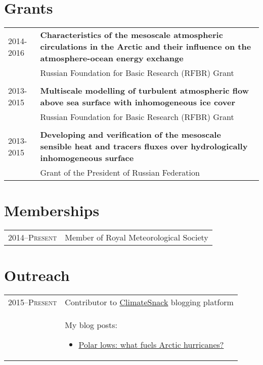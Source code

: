 \documentclass[a4paper,11pt]{article}
\newlength{\mycol}
\begin{document}
\section{Grants}
\begin{tabu} to 	
 2014-2016 & \textbf{Characteristics of the mesoscale atmospheric circulations in the Arctic and their influence on the atmosphere-ocean energy exchange} \\
& Russian Foundation for Basic Research (RFBR) Grant \\
 \\

 2013-2015 & \textbf{Multiscale modelling of turbulent atmospheric flow above sea surface with inhomogeneous ice cover}\\
& Russian Foundation for Basic Research (RFBR) Grant \\
 \\

 2013-2015 & \textbf{Developing and verification of the mesoscale sensible heat and tracers fluxes over hydrologically inhomogeneous surface} \\ 
& Grant of the President of Russian Federation
\end{tabu}

\section{Memberships}
\begin{tabu} to 	
 \textsc{2014--\small{Present}} & Member of Royal Meteorological Society
\end{tabu}

\section{Outreach}
\begin{tabu} to 	
 \textsc{2015--\small{Present}} & Contributor to \href{http://www.climatesnack.com/}{ClimateSnack} blogging platform \\
& My blog posts:
\begin{itemize}
\item \href{http://www.climatesnack.com/2015/03/04/polar-lows-what-fuels-arctic-hurricanes/}{Polar lows: what fuels Arctic hurricanes?}
\end{itemize}
\end{tabu}
\end{document}
